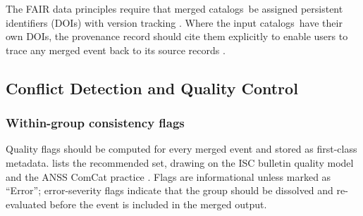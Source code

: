 \documentclass[12pt]{article}
\newcommand{\catalogs}{catalogs}
\begin{document}
The FAIR data principles \citep{FAIRPrinciples2016} require that merged
\catalogs\ be assigned persistent identifiers (DOIs) with version tracking
\citep{DataCiteVersioning}.  Where the input \catalogs\ have their own DOIs,
the provenance record should cite them explicitly to enable users to trace
any merged event back to its source records \citep{GOFAIR}.

\subsection{Conflict Detection and Quality Control}
\label{sec:qc}

\subsubsection{Within-group consistency flags}

Quality flags should be computed for every merged event and stored as first-class
metadata.   lists the recommended set, drawing on the ISC
bulletin quality model \citep{Bondar2011, ISCBulletinRebuild2020} and the ANSS
ComCat practice \citep{usgs_comcat}.  Flags are informational unless marked
as ``Error''; error-severity flags indicate that the group should be dissolved
and re-evaluated before the event is included in the merged output.
\end{document}
